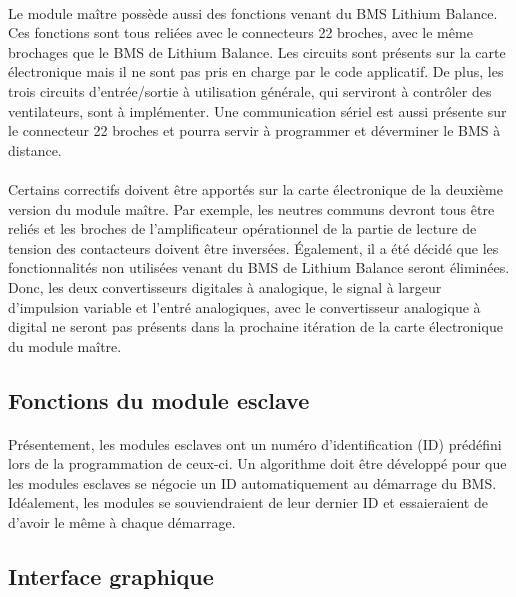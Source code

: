 		\paragraph{}
		Le module maître possède aussi des fonctions venant du BMS Lithium Balance. Ces fonctions sont tous reliées avec le connecteurs 22 broches, avec le même brochages que le BMS de Lithium Balance. Les circuits sont présents sur la carte électronique mais il ne sont pas pris en charge par le code applicatif. De plus, les trois circuits d'entrée/sortie à utilisation générale, qui serviront à contrôler des ventilateurs, sont à implémenter. Une communication sériel est aussi présente sur le connecteur 22 broches et pourra servir à programmer et déverminer le BMS à distance.

		\paragraph{}
		Certains correctifs doivent être apportés sur la carte électronique de la deuxième version du module maître. Par exemple, les neutres communs devront tous être reliés et les broches de l'amplificateur opérationnel de la partie de lecture de tension des contacteurs doivent être inversées. Également, il a été décidé que les fonctionnalités non utilisées venant du BMS de Lithium Balance seront éliminées. Donc, les deux convertisseurs digitales à analogique, le signal à largeur d'impulsion variable et l'entré analogiques, avec le convertisseur analogique à digital ne seront pas présents dans la prochaine itération de la carte électronique du module maître.

	\subsection{Fonctions du module esclave}

		\paragraph{}
		Présentement, les modules esclaves ont un numéro d'identification (ID) prédéfini lors de la programmation de ceux-ci. Un algorithme doit être développé pour que les modules esclaves se négocie un ID automatiquement au démarrage du BMS. Idéalement, les modules se souviendraient de leur dernier ID et essaieraient de d'avoir le même à chaque démarrage.

	\subsection{Interface graphique}
